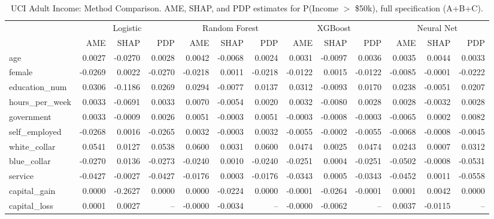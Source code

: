\documentclass[12pt]{article}
\begin{document}
	\begin{table}
		\centering
		\small
		\begin{threeparttable}
			\caption{UCI Adult Income: Method Comparison. AME, SHAP, and PDP estimates for P(Income $>$ \$50k), full specification (A+B+C).}
			\label{tab:adult_method_comparison}
			\begin{tabular}{lrrrrrrrrrrrr}
				\toprule
				& \multicolumn{3}{c}{Logistic} & \multicolumn{3}{c}{Random Forest} & \multicolumn{3}{c}{XGBoost} & \multicolumn{3}{c}{Neural Net} \\
				\cmidrule(lr){2-4} \cmidrule(lr){5-7} \cmidrule(lr){8-10} \cmidrule(lr){11-13} 
				& AME & SHAP & PDP & AME & SHAP & PDP & AME & SHAP & PDP & AME & SHAP & PDP \\
				\midrule
				age & 0.0027 & -0.0270 & 0.0028 & 0.0042 & -0.0068 & 0.0024 & 0.0031 & -0.0097 & 0.0036 & 0.0035 & 0.0044 & 0.0033 \\
				female & -0.0269 & 0.0022 & -0.0270 & -0.0218 & 0.0011 & -0.0218 & -0.0122 & 0.0015 & -0.0122 & -0.0085 & -0.0001 & -0.0222 \\
				education\_num & 0.0306 & -0.1186 & 0.0269 & 0.0294 & -0.0077 & 0.0137 & 0.0312 & -0.0093 & 0.0170 & 0.0238 & -0.0051 & 0.0207 \\
				\midrule
				hours\_per\_week & 0.0033 & -0.0691 & 0.0033 & 0.0070 & -0.0054 & 0.0020 & 0.0032 & -0.0080 & 0.0028 & 0.0028 & -0.0032 & 0.0028 \\
				government & 0.0033 & -0.0009 & 0.0026 & 0.0051 & -0.0003 & 0.0051 & -0.0003 & -0.0008 & -0.0003 & -0.0065 & 0.0002 & 0.0082 \\
				self\_employed & -0.0268 & 0.0016 & -0.0265 & 0.0032 & -0.0003 & 0.0032 & -0.0055 & -0.0002 & -0.0055 & -0.0068 & -0.0008 & -0.0045 \\
				white\_collar & 0.0541 & 0.0127 & 0.0538 & 0.0600 & 0.0031 & 0.0600 & 0.0474 & 0.0025 & 0.0474 & 0.0243 & 0.0007 & 0.0312 \\
				blue\_collar & -0.0270 & 0.0136 & -0.0273 & -0.0240 & 0.0010 & -0.0240 & -0.0251 & 0.0004 & -0.0251 & -0.0502 & -0.0008 & -0.0531 \\
				service & -0.0427 & -0.0027 & -0.0427 & -0.0176 & 0.0003 & -0.0176 & -0.0343 & 0.0005 & -0.0343 & -0.0452 & 0.0011 & -0.0558 \\
				\midrule
				capital\_gain & 0.0000 & -0.2627 & 0.0000 & 0.0000 & -0.0224 & 0.0000 & -0.0001 & -0.0264 & -0.0001 & 0.0001 & 0.0042 & 0.0000 \\
				capital\_loss & 0.0001 & 0.0027 & -- & -0.0000 & -0.0034 & -- & -0.0000 & -0.0062 & -- & 0.0037 & -0.0115 & -- \\

\end{tabular}
\end{threeparttable}
\end{table}
\end{document}
